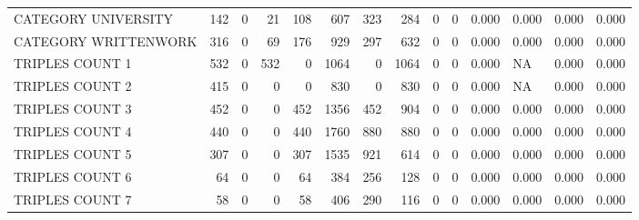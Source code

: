 \begin{tabular}{lrrrrrrrrrllll}
 CATEGORY UNIVERSITY      &             142 &             0 &              21 &             108 &             607 &  323 &  284 &    0 &    0 & 0.000 & 0.000 & 0.000 & 0.000 \\
 CATEGORY WRITTENWORK     &             316 &             0 &              69 &             176 &             929 &  297 &  632 &    0 &    0 & 0.000 & 0.000 & 0.000 & 0.000 \\
 TRIPLES COUNT 1          &             532 &             0 &             532 &               0 &            1064 &    0 & 1064 &    0 &    0 & 0.000 & NA    & 0.000 & 0.000 \\
 TRIPLES COUNT 2          &             415 &             0 &               0 &               0 &             830 &    0 &  830 &    0 &    0 & 0.000 & NA    & 0.000 & 0.000 \\
 TRIPLES COUNT 3          &             452 &             0 &               0 &             452 &            1356 &  452 &  904 &    0 &    0 & 0.000 & 0.000 & 0.000 & 0.000 \\
 TRIPLES COUNT 4          &             440 &             0 &               0 &             440 &            1760 &  880 &  880 &    0 &    0 & 0.000 & 0.000 & 0.000 & 0.000 \\
 TRIPLES COUNT 5          &             307 &             0 &               0 &             307 &            1535 &  921 &  614 &    0 &    0 & 0.000 & 0.000 & 0.000 & 0.000 \\
 TRIPLES COUNT 6          &              64 &             0 &               0 &              64 &             384 &  256 &  128 &    0 &    0 & 0.000 & 0.000 & 0.000 & 0.000 \\
 TRIPLES COUNT 7          &              58 &             0 &               0 &              58 &             406 &  290 &  116 &    0 &    0 & 0.000 & 0.000 & 0.000 & 0.000 \\
\hline
\end{tabular}